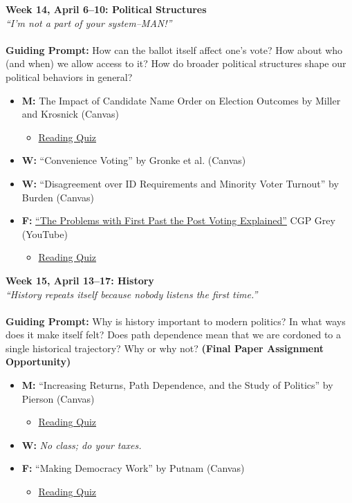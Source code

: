 \documentclass[11pt]{article}
\def\doubleq#1{``#1''}
\begin{document}
\textbf{Week 14, April 6--10: Political Structures}
\\
\textit{``I'm not a part of your system--MAN!''}
\\\\
\textbf{Guiding Prompt:} How can the ballot itself affect one's vote? How about who (and when) we allow access to it? How do broader political structures shape our political behaviors in general?   
\begin{itemize}
\item \textbf{M:} {The Impact of Candidate Name Order on Election Outcomes} by Miller and Krosnick (Canvas)
\begin{itemize}
\item\underline{Reading Quiz}
\end{itemize}
\item \textbf{W:} \doubleq{Convenience Voting} by Gronke et al. (Canvas) 
\item \textbf{W:} \doubleq{Disagreement over ID Requirements and Minority Voter Turnout} by Burden (Canvas)
\item \textbf{F:} \href{https://www.youtube.com/watch?v=s7tWHJfhiyo}{\doubleq{The Problems with First Past the Post Voting Explained}} CGP Grey (YouTube)
\begin{itemize}
\item\underline{Reading Quiz}
\end{itemize}
\end{itemize}
\textbf{Week 15, April 13--17: History}
\\
\textit{``History repeats itself because nobody listens the first time.''}
\\\\
\textbf{Guiding Prompt:} Why is history important to modern politics? In what ways does it make itself felt? Does path dependence mean that we are cordoned to a single historical trajectory? Why or why not? \textbf{(Final Paper Assignment Opportunity)}
\begin{itemize}
\item \textbf{M:} \doubleq{Increasing Returns, Path Dependence, and the Study of Politics} by Pierson (Canvas)
\begin{itemize}
\item\underline{Reading Quiz}
\end{itemize}
\item \textbf{W:} \textit{No class; do your taxes.}
\item \textbf{F:} \doubleq{Making Democracy Work} by Putnam (Canvas)
\begin{itemize}
\item\underline{Reading Quiz}
\end{itemize}
\end{itemize}
\end{document}

